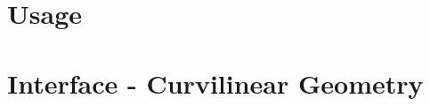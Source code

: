 \documentclass[a4paper,11pt]{article}
\begin{document}





\newpage
\section{Usage}














\newpage
\section{Interface - Curvilinear Geometry}




%




%






\end{document}
